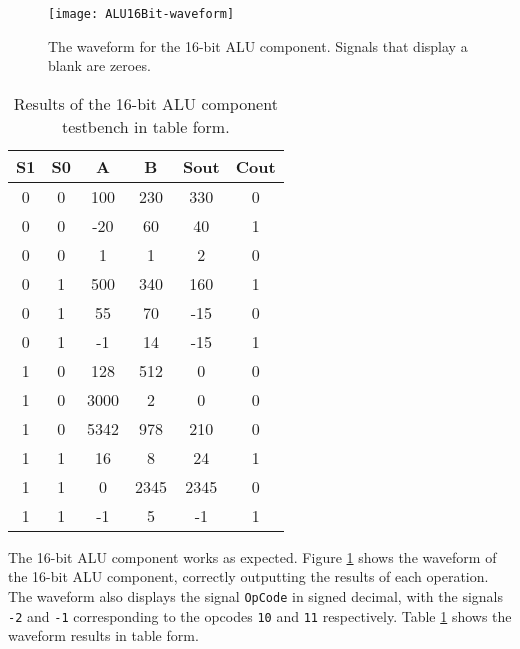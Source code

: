 \documentclass[11pt]{report}
\begin{document}
\begin{figure}[h!]
    \centering
    \texttt{[image: ALU16Bit-waveform]}
    \caption{The waveform for the 16-bit ALU component. Signals that display a blank are zeroes.}
    \label{fig:ALU16Bit-waveform}
\end{figure}

\begin{table}[ht!]
    \centering
    \begin{tabular}{|cc||cc|c|c|} 
     \hline
     S1 & S0 & A & B & Sout & Cout \\
     \hline
     0 & 0 & 100 & 230 & 330 & 0 \\ 
     \hline
     0 & 0 & -20 &  60 &  40 & 1 \\
     \hline
     0 & 0 &   1 &   1 &   2 & 0 \\
     \hline
     0 & 1 & 500 & 340 & 160 & 1 \\ 
     \hline
     0 & 1 &  55 &  70 & -15 & 0 \\
     \hline
     0 & 1 &  -1 &  14 & -15 & 1 \\
     \hline
     1 & 0 &  128 & 512 &   0 & 0 \\ 
     \hline
     1 & 0 & 3000 &   2 &   0 & 0 \\
     \hline
     1 & 0 & 5342 & 978 & 210 & 0 \\
     \hline
     1 & 1 & 16 &    8 &   24 & 1 \\ 
     \hline
     1 & 1 &  0 & 2345 & 2345 & 0 \\
     \hline
     1 & 1 & -1 &    5 &   -1 & 1 \\
     \hline
    \end{tabular}
    \caption{Results of the 16-bit ALU component testbench in table form.}
    \label{table:ALU16Bit-waveform_table}
\end{table}

The 16-bit ALU component works as expected. Figure \ref{fig:ALU16Bit-waveform} shows the waveform of
the 16-bit ALU component, correctly outputting the results of each operation. The waveform also
displays the signal \verb|OpCode| in signed decimal, with the signals \verb|-2| and \verb|-1|
corresponding to the opcodes \verb|10| and \verb|11| respectively. Table
\ref{table:ALU16Bit-waveform_table} shows the waveform results in table form.
\end{document}
